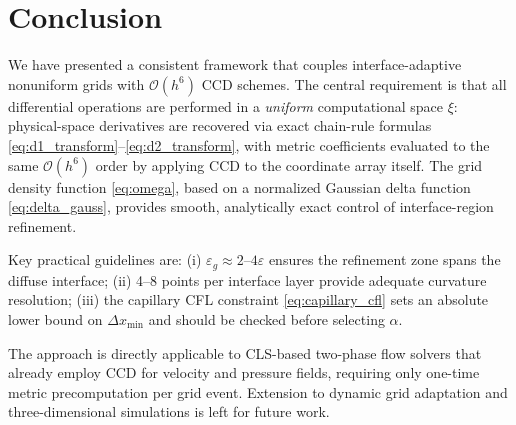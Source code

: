 \documentclass[10pt,a4paper,twocolumn]{article}
\newcommand{\Ord}[1]{\mathcal{O}(#1)}
\newcommand{\eps}{\varepsilon}
\begin{document}
\section{Conclusion}
\label{sec:conclusion}

We have presented a consistent framework that couples interface-adaptive
nonuniform grids with $\Ord{h^6}$ CCD schemes. The central requirement is
that all differential operations are performed in a \emph{uniform}
computational space $\xi$: physical-space derivatives are recovered via
exact chain-rule formulas \eqref{eq:d1_transform}--\eqref{eq:d2_transform},
with metric coefficients evaluated to the same $\Ord{h^6}$ order by
applying CCD to the coordinate array itself. The grid density function
\eqref{eq:omega}, based on a normalized Gaussian delta function
\eqref{eq:delta_gauss}, provides smooth, analytically exact control of
interface-region refinement.

Key practical guidelines are:
(i) $\eps_g \approx 2$--$4\eps$ ensures the refinement zone spans the
diffuse interface;
(ii) 4--8 points per interface layer provide adequate curvature resolution;
(iii) the capillary CFL constraint \eqref{eq:capillary_cfl} sets an
absolute lower bound on $\Delta x_{\min}$ and should be checked before
selecting $\alpha$.

The approach is directly applicable to CLS-based two-phase flow solvers
that already employ CCD for velocity and pressure fields, requiring only
one-time metric precomputation per grid event.  Extension to dynamic grid
adaptation and three-dimensional simulations is left for future work.



\end{document}
